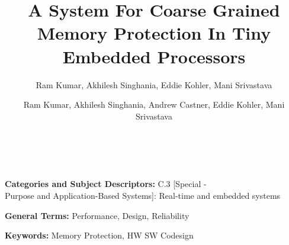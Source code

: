 \documentclass{sig-alternate}
\begin{document}
\date{}

\title{A System For Coarse Grained Memory Protection In Tiny Embedded Processors}

\author{Ram Kumar, Akhilesh Singhania, Eddie Kohler, Mani Srivastava}
\author{
\alignauthor Ram Kumar, Akhilesh Singhania, Andrew Castner, Eddie Kohler, Mani Srivastava \\
	\\
	\\
}

\maketitle
\thispagestyle{empty}


\begin{abstract}

\end{abstract}
%

\vspace{1mm}
\noindent
{\bf Categories and Subject Descriptors:} C.3 {[Special - \\Purpose and Application-Based Systems]}: {Real-time and embedded systems}

\vspace{1mm}
\noindent
{\bf General Terms:} Performance, Design, Reliability

\vspace{1mm}
\noindent
{\bf Keywords:} Memory Protection, HW SW Codesign








\footnotesize{


}
\end{document}
